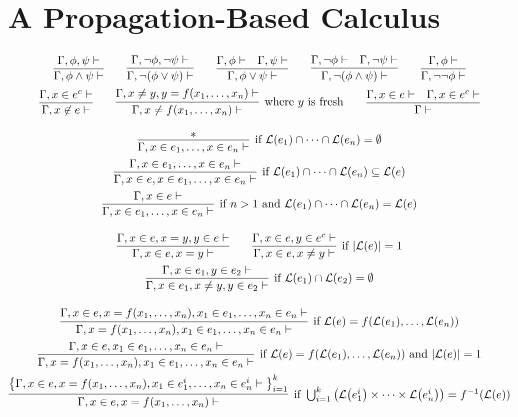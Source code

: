 
\section{A Propagation-Based Calculus}
\label{sect:calculus}

\begin{table}
  \begin{gather*}
    \infer
    {\seqq{\phi \wedge \psi}}
    {\seqq{\phi, \psi}}
    \qquad
    \infer
    {\seqq{ \neg(\phi \vee \psi)}}
    {\seqq{ \neg\phi, \neg\psi}}
    \qquad
    \infer
    {\seqq{\phi \vee \psi}}
    {\seqq{\phi} & \seqq{\psi}}
    \qquad
    \infer
    {\seqq{\neg(\phi \wedge \psi)}}
    {\seqq{\neg\phi} & \seqq{\neg\psi}}
    \qquad
    \infer
    {\seqq{ \neg\neg\phi}}
    {\seqq{\phi}}
    \\
    \infer
    {\seqq{x \not\in e}}
    {\seqq{x \in e^c}}
    \qquad
    \infer[\text{where~} y \text{~is fresh}]
    {\seqq{x \not= f(x_1, \ldots, x_n)}}
    {\seqq{x \not= y, y = f(x_1, \ldots, x_n)}}
    \qquad
    \infer
    {\seqq{}}
    {\seqq{x \in e} & \seqq{x \in e^c}}
    \\[2ex]
    \infer[\text{if~} \lang{e_1} \cap \cdots \cap\lang{e_n} = \emptyset]
    {\seqq{x \in e_1, \ldots, x \in e_n}}
    {*}
    \\
    \infer[\text{if~} \lang{e_1} \cap \cdots \cap\lang{e_n} \subseteq \lang{e}]
    {\seqq{x \in e, x \in e_1, \ldots, x \in e_n}}
    {\seqq{x \in e_1, \ldots, x \in e_n}}
    \\
    \infer[\text{if~} n > 1 \text{~and~} \lang{e_1} \cap \cdots \cap\lang{e_n} = \lang{e}]
    {\seqq{x \in e_1, \ldots, x \in e_n}}
    {\seqq{x \in e}}
    \\[2ex]
    \infer
    {\seqq{x \in e, x = y}}
    {\seqq{x \in e, x = y, y \in e}}
    \qquad
    \infer[\text{if~} |\lang{e}| = 1]
    {\seqq{x \in e, x \not= y}}
    {\seqq{x \in e, y \in e^c}}
    \\
    \infer[\text{if~} \lang{e_1} \cap \lang{e_2} = \emptyset]
    {\seqq{x \in e_1, x \not= y, y \in e_2}}
    {\seqq{x \in e_1, y \in e_2}}
    \\[2ex]
    \infer[\text{if~} \lang{e} = f(\lang{e_1}, \ldots, \lang{e_n})]
    {\seqq{x = f(x_1, \ldots, x_n), x_1 \in e_1, \ldots, x_n \in e_n}}
    {\seqq{x \in e, x = f(x_1, \ldots, x_n), x_1 \in e_1, \ldots, x_n \in e_n}}
    \\
    \infer[\text{if~}
    \lang{e} = f(\lang{e_1}, \ldots, \lang{e_n}) \text{~and~} 
    |\lang{e}|= 1]
    {\seqq{x = f(x_1, \ldots, x_n), x_1 \in e_1, \ldots, x_n \in e_n}}
    {\seqq{x \in e, x_1 \in e_1, \ldots, x_n \in e_n}}
    \\
    \infer[\text{if~}
    \bigcup_{i=1}^k \big( \lang{e_1^i} \times \cdots \times \lang{e_n^i} \big) =
    f^{-1}(\lang{e})]
    {\seqq{x \in e, x = f(x_1, \ldots, x_n)}}
    {\big\{\seqq{x \in e, x = f(x_1, \ldots, x_n),
        x_1 \in e_1^i, \ldots, x_n \in e_n^i}\big\}_{i=1}^k}
  \end{gather*}
  
  \caption{Rules of the one-sided sequent calculus}
\end{table}


